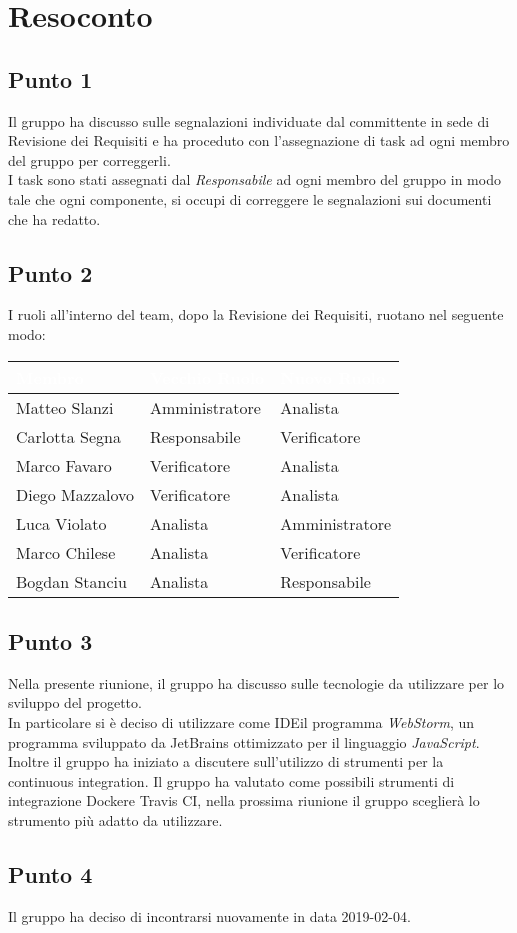 \section{Resoconto}

\subsection{Punto 1}
Il gruppo ha discusso sulle segnalazioni individuate dal committente in sede di Revisione dei Requisiti e ha proceduto con l'assegnazione di task ad ogni membro del gruppo per correggerli.
\\
I task sono stati assegnati dal \textit{Responsabile} ad ogni membro del gruppo in modo tale che ogni componente, si occupi di correggere le segnalazioni sui documenti che ha redatto.

\subsection{Punto 2}
I ruoli all'interno del team, dopo la Revisione dei Requisiti, ruotano nel seguente modo:\\
\begin{center}
\begin{longtable}[c]{|m{}|m{}|m{}|} 
\hline
\rowcolor{bluelogo}\textbf{\textcolor{white}{Membro}} & \textbf{\textcolor{white}{Vecchio Ruolo}} & \textbf{\textcolor{white}{Nuovo Ruolo}}\\
\hline
Matteo Slanzi & Amministratore & Analista\\
\hline
\rowcolor{grigio}Carlotta Segna & Responsabile & Verificatore\\
\hline
Marco Favaro & Verificatore & Analista\\
\hline
\rowcolor{grigio}Diego Mazzalovo & Verificatore & Analista\\
\hline
Luca Violato & Analista & Amministratore\\
\hline
\rowcolor{grigio}Marco Chilese & Analista & Verificatore\\
\hline
Bogdan Stanciu & Analista & Responsabile\\
\hline
\end{longtable}
\end{center}

\subsection{Punto 3}
Nella presente riunione, il gruppo ha discusso sulle tecnologie da utilizzare per lo sviluppo del progetto. 
\\
In particolare si è deciso di utilizzare come IDE\glossario il programma \textit{WebStorm}, un programma sviluppato da JetBrains ottimizzato per il linguaggio \textit{JavaScript}. 
\\
Inoltre il gruppo ha iniziato a discutere sull'utilizzo di strumenti per la continuous integration\glossario. 
Il gruppo ha valutato come possibili strumenti di integrazione Docker\glossario e Travis CI\glossario, nella prossima riunione il gruppo sceglierà lo strumento più adatto da utilizzare.

\subsection{Punto 4}
Il gruppo ha deciso di incontrarsi nuovamente in data 2019-02-04.